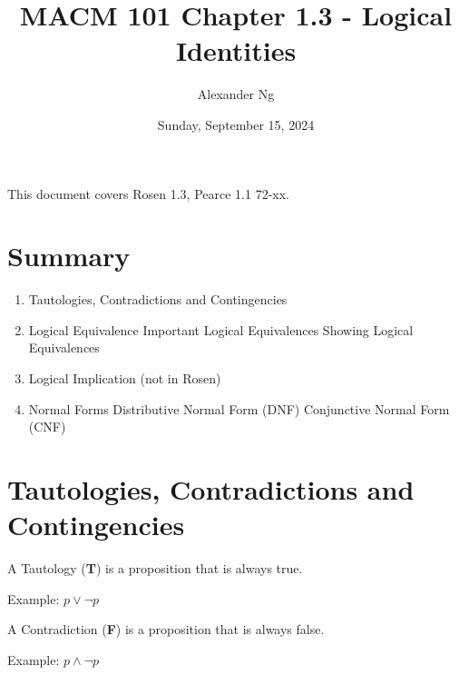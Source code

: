 \documentclass[12pt]{article}
\begin{document}
\title{MACM 101 Chapter 1.3 - Logical Identities}
\author{Alexander Ng}
\date{Sunday, September 15, 2024}

\maketitle

This document covers Rosen 1.3, Pearce 1.1 72-xx.

\section*{Summary}

\begin{enumerate}
\item Tautologies, Contradictions and Contingencies
\item Logical Equivalence
  \subitem Important Logical Equivalences
  \subitem Showing Logical Equivalences
\item Logical Implication (not in Rosen)
\item Normal Forms
  \subitem Distributive Normal Form (DNF)
  \subitem Conjunctive Normal Form (CNF)
\end{enumerate}


\pagebreak

\section{Tautologies, Contradictions and Contingencies}

A Tautology (\textbf{T}) is a proposition that is always true.

Example: $p \lor \neg p$

A Contradiction (\textbf{F}) is a proposition that is always false.

Example: $p \land \neg p$
\end{document}
